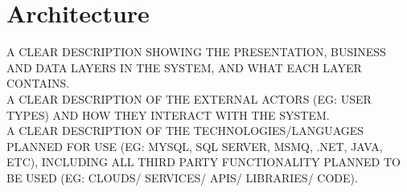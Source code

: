 
\section{Architecture}
    \label{sec:arch}

{\color{red}
A CLEAR DESCRIPTION SHOWING THE PRESENTATION, BUSINESS AND DATA LAYERS IN THE
SYSTEM, AND WHAT EACH LAYER CONTAINS.\\

\noindent A CLEAR DESCRIPTION OF THE EXTERNAL ACTORS (EG: USER TYPES) AND HOW THEY INTERACT
WITH THE SYSTEM.\\

\noindent A CLEAR DESCRIPTION OF THE TECHNOLOGIES/LANGUAGES PLANNED FOR USE (EG: MYSQL,
SQL SERVER, MSMQ, .NET, JAVA, ETC), INCLUDING ALL THIRD PARTY FUNCTIONALITY PLANNED
TO BE USED (EG: CLOUDS/ SERVICES/ APIS/ LIBRARIES/ CODE).}
